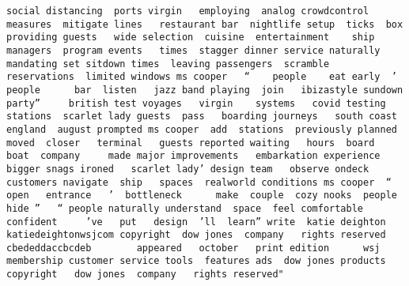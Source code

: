 \documentclass[
]{article}
\begin{document}
\begin{verbatim}
social distancing  ports virgin   employing  analog crowdcontrol measures  mitigate lines   restaurant bar  nightlife setup  ticks  box  providing guests   wide selection  cuisine  entertainment    ship managers  program events   times  stagger dinner service naturally  mandating set sitdown times  leaving passengers  scramble  reservations  limited windows ms cooper   “    people    eat early  ’  people      bar  listen   jazz band playing  join   ibizastyle sundown party”     british test voyages   virgin    systems   covid testing stations  scarlet lady guests  pass   boarding journeys   south coast  england  august prompted ms cooper  add  stations  previously planned   moved  closer   terminal   guests reported waiting   hours  board  boat  company     made major improvements   embarkation experience  bigger snags ironed   scarlet lady’ design team   observe ondeck  customers navigate  ship   spaces  realworld conditions ms cooper  “         open   entrance   ’  bottleneck      make  couple  cozy nooks  people  hide ”   “ people naturally understand  space  feel comfortable  confident     ’ve   put   design  ’ll  learn” write  katie deighton  katiedeightonwsjcom copyright  dow jones  company   rights reserved cbededdaccbcdeb        appeared   october   print edition      wsj membership customer service tools  features ads  dow jones products copyright   dow jones  company   rights reserved"                                                                                                                                                                                                                                                                                                                                                                                                                                                                                                                                                                                                                                                                                                                                                                                                                                                                                                                                                                                                                                                                                                                                                                                                                                                                                                                                                                                                                                                                                                                                                                                                                                                                                                                                                                                                                                                                                                                                                                             
\end{verbatim}
\end{document}
